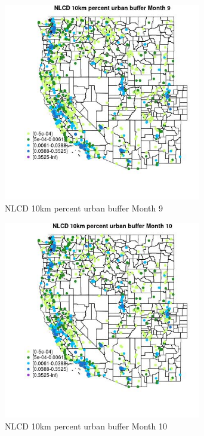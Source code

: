 \begin{figure} 
\centering  
\includegraphics[width=0.77\textwidth]{Code_Outputs/Report_ML_input_PM25_Step4_part_f_de_duplicated_aveswNAs_MapObsMo9NLCD_10km_percent_urban_buffer.jpg} 
\caption{\label{fig:Report_ML_input_PM25_Step4_part_f_de_duplicated_aveswNAsMapObsMo9NLCD_10km_percent_urban_buffer}NLCD 10km percent urban buffer Month 9} 
\end{figure} 
 

\clearpage 

\begin{figure} 
\centering  
\includegraphics[width=0.77\textwidth]{Code_Outputs/Report_ML_input_PM25_Step4_part_f_de_duplicated_aveswNAs_MapObsMo10NLCD_10km_percent_urban_buffer.jpg} 
\caption{\label{fig:Report_ML_input_PM25_Step4_part_f_de_duplicated_aveswNAsMapObsMo10NLCD_10km_percent_urban_buffer}NLCD 10km percent urban buffer Month 10} 
\end{figure} 
 

